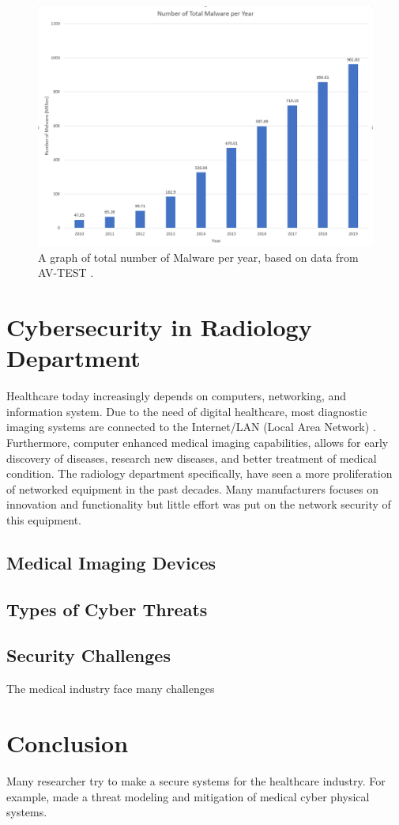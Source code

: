 \documentclass{IEEEtran}
\begin{document}
\begin{figure}
	\centering
	\includegraphics[width=0.7\linewidth]{"Total Number Of Malware per Year"}
	\caption{A graph of total number of Malware per year, based on data from AV-TEST \cite{AVtest}.}
	\label{fig:total-number-of-malware-per-year}
\end{figure}


\section{Cybersecurity in Radiology Department}
Healthcare today increasingly depends on computers, networking, and information system. Due to the need of digital healthcare, most diagnostic imaging systems are connected to the Internet/LAN (Local Area Network) \cite{ma2019medical}. Furthermore, computer enhanced medical imaging capabilities, allows for early discovery of diseases, research new diseases, and better treatment of medical condition.  The radiology department specifically, have seen a more proliferation of networked equipment in the past decades. Many manufacturers focuses on innovation and functionality but little effort was put on the network security of this equipment.
\subsection{Medical Imaging Devices}

\subsection{Types of Cyber Threats}

\subsection{Security Challenges}
The medical industry face many challenges 

\section{Conclusion}
Many researcher try to make a secure systems for the healthcare industry. For example, \cite{Almohri:2017:TMM:3204094.3204113} made a threat modeling and mitigation of medical cyber physical systems. 





\end{document}
